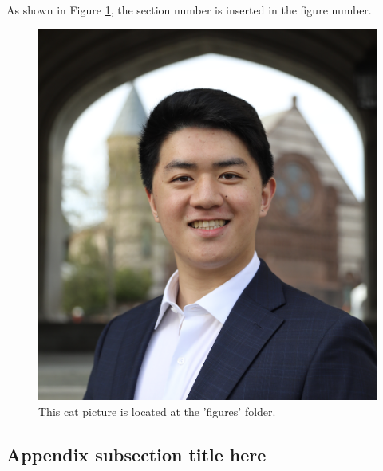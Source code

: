 \documentclass[12pt,a4paper]{article}
\begin{document}
\begin{appendices}
As shown in Figure \ref{fig:cat2}, the section number is inserted in the figure number.
\lipsum[13]

\begin{figure}[!htbp]
\centering
\includegraphics[width=0.8\linewidth]{figures/cat_momo_1.png}
\caption{\label{fig:cat2}This cat picture is located at the 'figures' folder.}
\end{figure}

\lipsum[14]

\subsection{Appendix subsection title here}
\lipsum[15]

\end{appendices}
\end{document}
